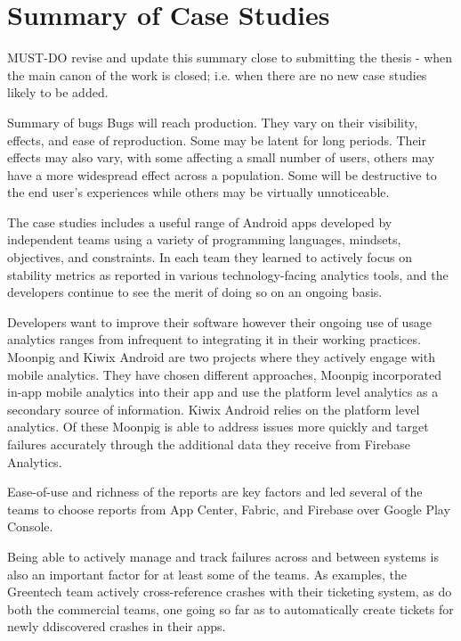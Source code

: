 \section{Summary of Case Studies}
MUST-DO revise and update this summary close to submitting the thesis - when the main canon of the work is closed; i.e. when there are no new case studies likely to be added.

Summary of bugs
Bugs will reach production. They vary on their visibility, effects, and ease of reproduction. Some may be latent for long periods. Their effects may also vary, with some affecting a small number of users, others may have a more widespread effect across a population. Some will be destructive to the end user's experiences while others may be virtually unnoticeable. 





The case studies includes a useful range of Android apps developed by independent teams using a variety of programming languages, mindsets, objectives, and constraints. In each team they learned to actively focus on stability metrics as reported in various technology-facing analytics tools, and the developers continue to see the merit of doing so on an ongoing basis.

Developers want to improve their software however their ongoing use of usage analytics ranges from infrequent to integrating it in their working practices. Moonpig and Kiwix Android are two projects where they actively engage with mobile analytics. They have chosen different approaches, Moonpig incorporated in-app mobile analytics into their app and use the platform level analytics as a secondary source of information. Kiwix Android relies on the platform level analytics. Of these Moonpig is able to address issues more quickly and target failures accurately through the additional data they receive from Firebase Analytics. 

Ease-of-use and richness of the reports are key factors and led several of the teams to choose reports from App Center, Fabric, and Firebase over Google Play Console.

Being able to actively manage and track failures across and between systems is also an important factor for at least some of the teams. As examples, the Greentech team actively cross-reference crashes with their ticketing system, as do both the commercial teams, one going so far as to automatically create tickets for newly ddiscovered crashes in their apps.


